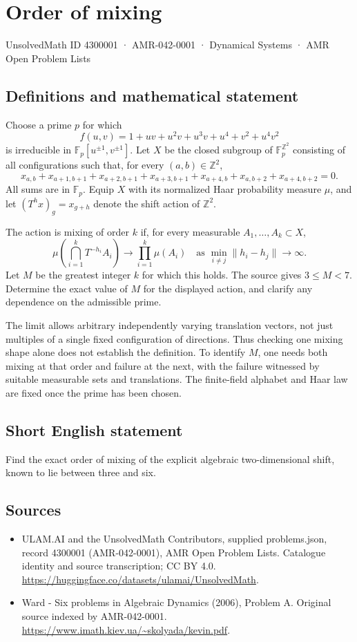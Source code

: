 \documentclass[11pt,a4paper]{article}
\begin{document}
\section*{Order of mixing}\label{4300001}
{\small UnsolvedMath ID 4300001 · AMR-042-0001 · Dynamical Systems · AMR Open Problem Lists}
\subsection{Definitions and mathematical statement}
Choose a prime $p$ for which
\[
 f(u,v)=1+uv+u^2v+u^3v+u^4+v^2+u^4v^2
\]
is irreducible in $\mathbb F_p[u^{\pm1},v^{\pm1}]$. Let $X$ be the closed
subgroup of $\mathbb F_p^{\mathbb Z^2}$ consisting of all configurations
such that, for every $(a,b)\in\mathbb Z^2$,
\[
 x_{a,b}+x_{a+1,b+1}+x_{a+2,b+1}+x_{a+3,b+1}
 +x_{a+4,b}+x_{a,b+2}+x_{a+4,b+2}=0.
\]
All sums are in $\mathbb F_p$. Equip $X$ with its normalized Haar
probability measure $\mu$, and let $(T^h x)_g=x_{g+h}$ denote the shift
action of $\mathbb Z^2$.

The action is mixing of order $k$ if, for every measurable
$A_1,\ldots,A_k\subset X$,
\[
 \mu\!\left(\bigcap_{i=1}^kT^{-h_i}A_i\right)
       \longrightarrow\prod_{i=1}^k\mu(A_i)
 \quad\text{as }\min_{i\ne j}\|h_i-h_j\|\longrightarrow\infty.
\]
Let $M$ be the greatest integer $k$ for which this holds. The source gives
$3\le M<7$. Determine the exact value of $M$ for the displayed action,
and clarify any dependence on the admissible prime.

The limit allows arbitrary independently varying translation vectors,
not just multiples of a single fixed configuration of directions. Thus
checking one mixing shape alone does not establish the definition. To
identify $M$, one needs both mixing at that order and failure at the next,
with the failure witnessed by suitable measurable sets and translations.
The finite-field alphabet and Haar law are fixed once the prime has been chosen.
\subsection{Short English statement}
Find the exact order of mixing of the explicit algebraic two-dimensional shift, known to lie between three and six.
\subsection{Sources}
\begin{itemize}
\item[S1] ULAM.AI and the UnsolvedMath Contributors, supplied problems.json, record 4300001 (AMR-042-0001), AMR Open Problem Lists. Catalogue identity and source transcription; CC BY 4.0.
\url{https://huggingface.co/datasets/ulamai/UnsolvedMath}.
\item[S2] Ward - Six problems in Algebraic Dynamics (2006), Problem A. Original source indexed by AMR-042-0001.
\url{https://www.imath.kiev.ua/~skolyada/kevin.pdf}.
\end{itemize}
\end{document}
